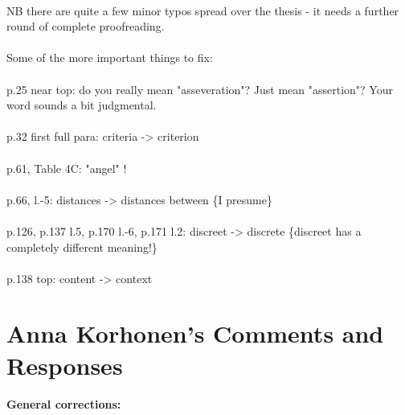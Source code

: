 \documentclass[11pt,a4paper]{article}
\begin{document}
\paragraph{}NB there are quite a few minor typos spread over the thesis - it needs a further round of complete proofreading.

\paragraph{} Some of the more important things to fix:

\paragraph{} p.25 near top: do you really mean "asseveration"? Just mean "assertion"? Your word sounds a bit judgmental.

\paragraph{} p.32 first full para:  criteria -> criterion

\paragraph{} p.61, Table 4C: "angel" !

\paragraph{} p.66, l.-5: distances -> distances between \{I presume\}

\paragraph{} p.126,   p.137 l.5,   p.170 l.-6,   p.171 l.2: discreet -> discrete \{discreet has a completely different meaning!\}

\paragraph{} p.138 top: content -> context 


\section{Anna Korhonen's Comments and Responses}

\paragraph{General corrections:}
\end{document}
